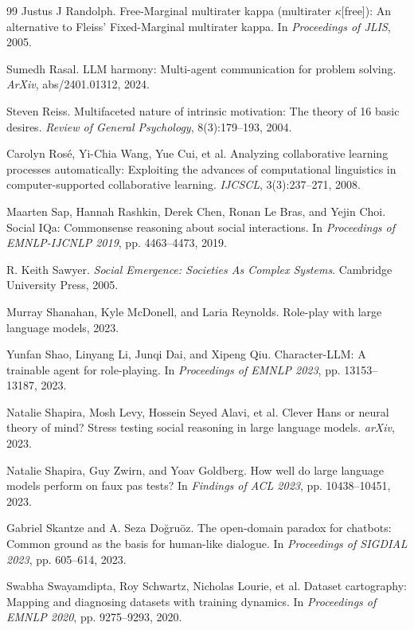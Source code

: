 \documentclass[11pt,a4paper]{article}
\begin{document}
\begin{thebibliography}{99}
Justus J Randolph. Free-Marginal multirater kappa (multirater $\kappa$[free]): An alternative to Fleiss' Fixed-Marginal multirater kappa. In \textit{Proceedings of JLIS}, 2005.

Sumedh Rasal. LLM harmony: Multi-agent communication for problem solving. \textit{ArXiv}, abs/2401.01312, 2024.

Steven Reiss. Multifaceted nature of intrinsic motivation: The theory of 16 basic desires. \textit{Review of General Psychology}, 8(3):179--193, 2004.

Carolyn Rosé, Yi-Chia Wang, Yue Cui, et al. Analyzing collaborative learning processes automatically: Exploiting the advances of computational linguistics in computer-supported collaborative learning. \textit{IJCSCL}, 3(3):237--271, 2008.

Maarten Sap, Hannah Rashkin, Derek Chen, Ronan Le Bras, and Yejin Choi. Social IQa: Commonsense reasoning about social interactions. In \textit{Proceedings of EMNLP-IJCNLP 2019}, pp. 4463--4473, 2019.

R. Keith Sawyer. \textit{Social Emergence: Societies As Complex Systems}. Cambridge University Press, 2005.

Murray Shanahan, Kyle McDonell, and Laria Reynolds. Role-play with large language models, 2023.

Yunfan Shao, Linyang Li, Junqi Dai, and Xipeng Qiu. Character-LLM: A trainable agent for role-playing. In \textit{Proceedings of EMNLP 2023}, pp. 13153--13187, 2023.

Natalie Shapira, Mosh Levy, Hossein Seyed Alavi, et al. Clever Hans or neural theory of mind? Stress testing social reasoning in large language models. \textit{arXiv}, 2023.

Natalie Shapira, Guy Zwirn, and Yoav Goldberg. How well do large language models perform on faux pas tests? In \textit{Findings of ACL 2023}, pp. 10438--10451, 2023.

Gabriel Skantze and A. Seza Doğruöz. The open-domain paradox for chatbots: Common ground as the basis for human-like dialogue. In \textit{Proceedings of SIGDIAL 2023}, pp. 605--614, 2023.

Swabha Swayamdipta, Roy Schwartz, Nicholas Lourie, et al. Dataset cartography: Mapping and diagnosing datasets with training dynamics. In \textit{Proceedings of EMNLP 2020}, pp. 9275--9293, 2020.


\end{thebibliography}
\end{document}
